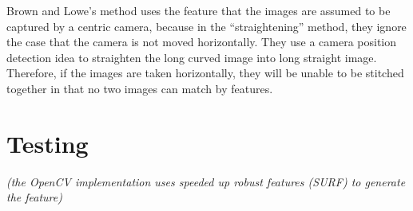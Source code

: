\documentclass[10pt,twocolumn,letterpaper]{article}
\begin{document}

Brown and Lowe's method uses the feature that the images are assumed to be captured by a centric camera,
because in the ``straightening'' method, they ignore the case that the camera is not moved horizontally.
They use a camera position detection idea to straighten the long curved image into long straight image.
Therefore, if the images are taken horizontally, they will be unable to be stitched together in that no two images can match by features.



\section{Testing}
\textit{(the OpenCV implementation uses speeded up robust features (SURF) \cite{surf} to generate the feature)}
\end{document}
